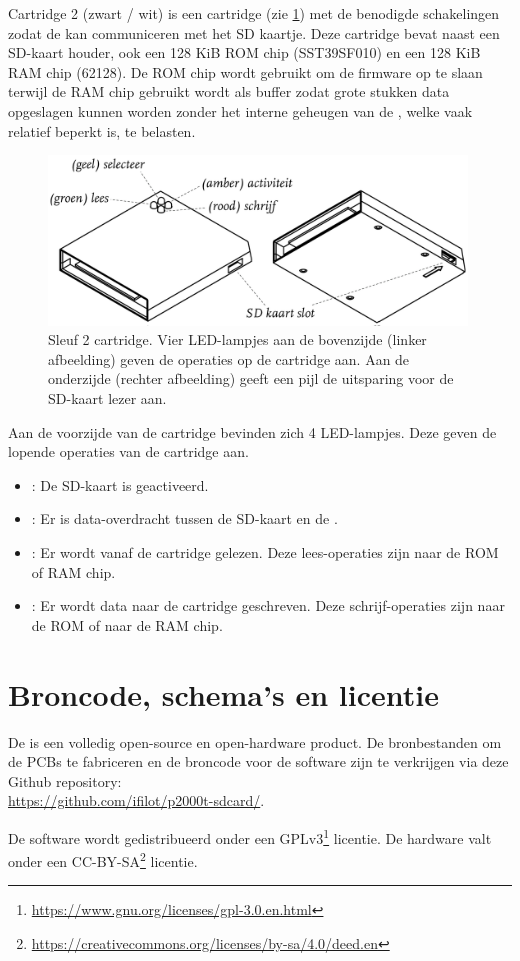 Cartridge 2 (zwart / wit) is een  cartridge (zie \cref{fig:cartridge-sleuf2}) met de benodigde schakelingen zodat de  kan communiceren met het SD kaartje. Deze cartridge bevat naast een SD-kaart houder, ook een 128 KiB ROM chip (SST39SF010) en een 128 KiB RAM chip (62128). De ROM chip wordt gebruikt om de firmware op te slaan terwijl de RAM chip gebruikt wordt als buffer zodat grote stukken data opgeslagen kunnen worden zonder het interne geheugen van de , welke vaak relatief beperkt is, te belasten.

\begin{figure}[h!]
    \centering
    \includegraphics[width=0.99\textwidth]{img/sd-card-cartridge.png}
    \caption{Sleuf 2 cartridge. Vier LED-lampjes aan de bovenzijde (linker afbeelding) geven de operaties op de cartridge aan. Aan de onderzijde (rechter afbeelding) geeft een pijl de uitsparing voor de SD-kaart lezer aan.}
    \label{fig:cartridge-sleuf2}
\end{figure}

Aan de voorzijde van de cartridge bevinden zich 4 LED-lampjes. Deze geven de lopende operaties van de cartridge aan.

\begin{itemize}[noitemsep]
    \item {}: De SD-kaart is geactiveerd.
    \item {}: Er is data-overdracht tussen de SD-kaart en de .
    \item {}: Er wordt vanaf de cartridge gelezen. Deze lees-operaties zijn naar de ROM of RAM chip.
    \item {}: Er wordt data naar de cartridge geschreven. Deze schrijf-operaties zijn naar de ROM of naar de RAM chip.
\end{itemize}

%
%
%
\section{Broncode, schema's en licentie}

De \product is een volledig open-source en open-hardware product. De bronbestanden om de PCBs te fabriceren en de broncode voor de software zijn te verkrijgen via deze Github repository:\\ \url{https://github.com/ifilot/p2000t-sdcard/}.

De software wordt gedistribueerd onder een GPLv3\footnote{\url{https://www.gnu.org/licenses/gpl-3.0.en.html}} licentie. De hardware valt onder een CC-BY-SA\footnote{\url{https://creativecommons.org/licenses/by-sa/4.0/deed.en}} licentie.